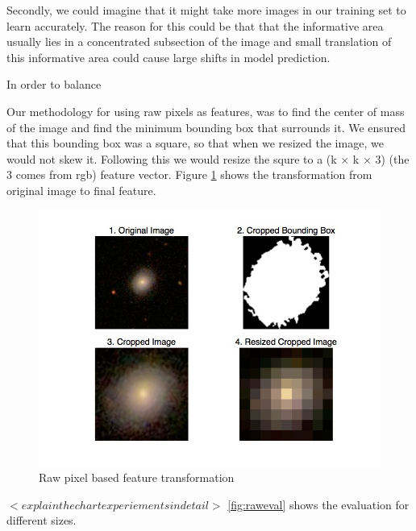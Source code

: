\documentclass[10pt]{article}
\begin{document}
Secondly, we could imagine that it might take more images in our training set to learn accurately. The reason for this could be that that the informative area usually lies in a concentrated subsection of the image and small translation of this informative area could cause large shifts in model prediction.

In order to balance

Our methodology for using raw pixels as features, was to find the center of mass of the image and find the minimum bounding box that surrounds it. We ensured that this bounding box was a square, so that when we resized the image, we would not skew it. Following this we would resize the squre to a (k × k × 3) (the 3 comes from rgb) feature vector. Figure \ref{fig:raw} shows the transformation from original image to final feature.

\begin{figure}[h]
\begin{center}
\includegraphics[scale=0.4]{images/hand_engineered_features.jpg}
\caption{Raw pixel based feature transformation}
\end{center}
\label{fig:raw}
\end{figure}

$<explain the chart experiements in detail>$ \ref{fig:raweval} shows the evaluation for different sizes.
\end{document}
